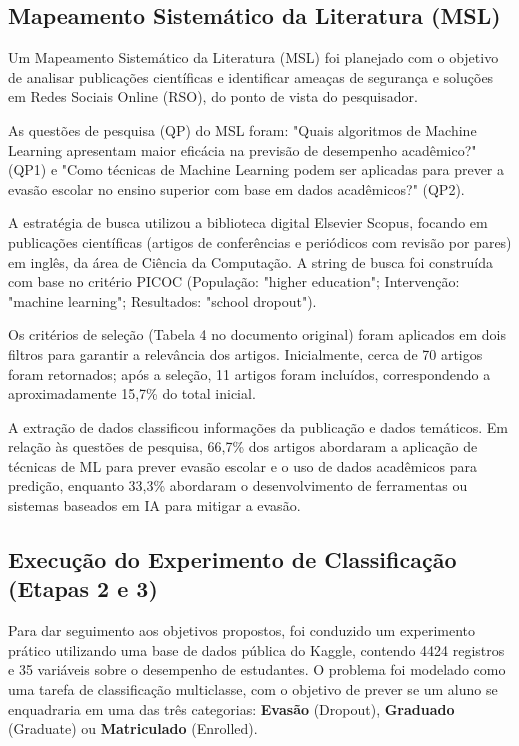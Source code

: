 \documentclass[12pt]{article}
\begin{document}
\subsection{Mapeamento Sistemático da Literatura (MSL)}
Um Mapeamento Sistemático da Literatura (MSL) foi planejado com o objetivo de analisar publicações científicas e identificar ameaças de segurança e soluções em Redes Sociais Online (RSO), do ponto de vista do pesquisador.

As questões de pesquisa (QP) do MSL foram: "Quais algoritmos de Machine Learning apresentam maior eficácia na previsão de desempenho acadêmico?" (QP1) e "Como técnicas de Machine Learning podem ser aplicadas para prever a evasão escolar no ensino superior com base em dados acadêmicos?" (QP2).

A estratégia de busca utilizou a biblioteca digital Elsevier Scopus, focando em publicações científicas (artigos de conferências e periódicos com revisão por pares) em inglês, da área de Ciência da Computação. A string de busca foi construída com base no critério PICOC (População: "higher education"; Intervenção: "machine learning"; Resultados: "school dropout").

Os critérios de seleção (Tabela 4 no documento original) foram aplicados em dois filtros para garantir a relevância dos artigos. Inicialmente, cerca de 70 artigos foram retornados; após a seleção, 11 artigos foram incluídos, correspondendo a aproximadamente 15,7\% do total inicial.

A extração de dados classificou informações da publicação e dados temáticos. Em relação às questões de pesquisa, 66,7\% dos artigos abordaram a aplicação de técnicas de ML para prever evasão escolar e o uso de dados acadêmicos para predição, enquanto 33,3\% abordaram o desenvolvimento de ferramentas ou sistemas baseados em IA para mitigar a evasão.


\subsection{Execução do Experimento de Classificação (Etapas 2 e 3)}
Para dar seguimento aos objetivos propostos, foi conduzido um experimento prático utilizando uma base de dados pública do Kaggle, contendo 4424 registros e 35 variáveis sobre o desempenho de estudantes. O problema foi modelado como uma tarefa de classificação multiclasse, com o objetivo de prever se um aluno se enquadraria em uma das três categorias: \textbf{Evasão} (Dropout), \textbf{Graduado} (Graduate) ou \textbf{Matriculado} (Enrolled).
\end{document}
